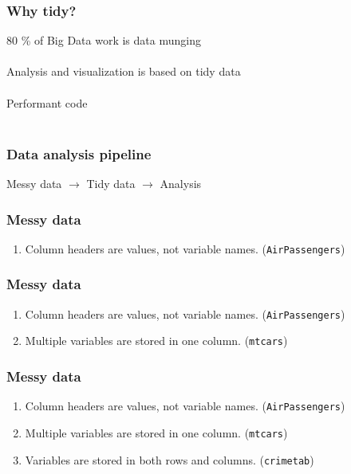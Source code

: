 \documentclass{beamer}
\begin{document}
\begin{frame}
	\frametitle{Why tidy?}
	\begin{center}
		80 \% of Big Data work is data munging\\~\\
		Analysis and visualization is based on tidy data\\~\\
		Performant code \\~\\
	\end{center}
\end{frame}

\begin{frame}
	\frametitle{Data analysis pipeline}
	\begin{center}
		Messy data $\rightarrow$ Tidy data $\rightarrow$ Analysis
	\end{center}
\end{frame}

\begin{frame}
	\frametitle{Messy data}
	\begin{center}
		\begin{enumerate}
			\item Column headers are values, not variable names. 
			(\texttt{AirPassengers})
		\end{enumerate}
	\end{center}
\end{frame}

\begin{frame}
	\frametitle{Messy data}
	\begin{center}
		\begin{enumerate}
			\item Column headers are values, not variable names. 
			(\texttt{AirPassengers})
			\item Multiple variables are stored in one column. (\texttt{mtcars})
		\end{enumerate}
	\end{center}
\end{frame}

\begin{frame}
	\frametitle{Messy data}
	\begin{center}
		\begin{enumerate}
			\item Column headers are values, not variable names. 
			(\texttt{AirPassengers})
			\item Multiple variables are stored in one column. (\texttt{mtcars})
			\item Variables are stored in both rows and columns. 
			(\texttt{crimetab})
		\end{enumerate}
	\end{center}
\end{frame}
\end{document}

